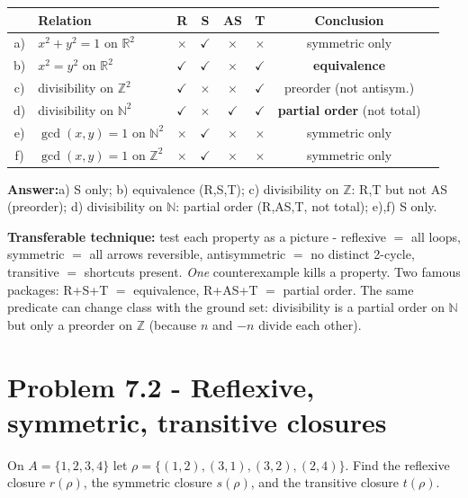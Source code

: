 \documentclass[11pt,a4paper]{article}
\newcommand{\Z}{\mathbb{Z}}
\newcommand{\R}{\mathbb{R}}
\newcommand{\N}{\mathbb{N}}
\newcommand{\answer}[1]{\begin{answerbox}\centering\textbf{Answer:}\quad #1\end{answerbox}}
\begin{document}
\begin{center}
\renewcommand{\arraystretch}{1.25}
\begin{tabular}{@{}clcccccl@{}}
\toprule
 & Relation & R & S & AS & T & Conclusion\\
\midrule
a) & $x^2+y^2=1$ on $\R^2$ & $\times$ & $\checkmark$ & $\times$ & $\times$ & symmetric only\\
b) & $x^2=y^2$ on $\R^2$ & $\checkmark$ & $\checkmark$ & $\times$ & $\checkmark$ & \textbf{equivalence}\\
c) & divisibility on $\Z^2$ & $\checkmark$ & $\times$ & $\times$ & $\checkmark$ & preorder (not antisym.)\\
d) & divisibility on $\N^2$ & $\checkmark$ & $\times$ & $\checkmark$ & $\checkmark$ & \textbf{partial order} (not total)\\
e) & $\gcd(x,y)=1$ on $\N^2$ & $\times$ & $\checkmark$ & $\times$ & $\times$ & symmetric only\\
f) & $\gcd(x,y)=1$ on $\Z^2$ & $\times$ & $\checkmark$ & $\times$ & $\times$ & symmetric only\\
\bottomrule
\end{tabular}
\end{center}

\answer{a) S only; b) equivalence (R,S,T); c) divisibility on $\Z$: R,T but not AS (preorder); d) divisibility on $\N$: partial order (R,AS,T, not total); e),f) S only.}

\begin{methodbox}
\textbf{Transferable technique:} test each property as a picture - reflexive $=$ all loops,
symmetric $=$ all arrows reversible, antisymmetric $=$ no distinct 2-cycle, transitive $=$ shortcuts
present. \emph{One} counterexample kills a property. Two famous packages: R+S+T $=$ equivalence,
R+AS+T $=$ partial order. The same predicate can change class with the ground set: divisibility is a
partial order on $\N$ but only a preorder on $\Z$ (because $n$ and $-n$ divide each other).
\end{methodbox}

\section*{Problem 7.2 - Reflexive, symmetric, transitive closures}

\begin{problembox}[7.2]
On $A=\{1,2,3,4\}$ let $\rho=\{(1,2),(3,1),(3,2),(2,4)\}$. Find the reflexive closure $r(\rho)$,
the symmetric closure $s(\rho)$, and the transitive closure $t(\rho)$.
\end{problembox}
\end{document}
